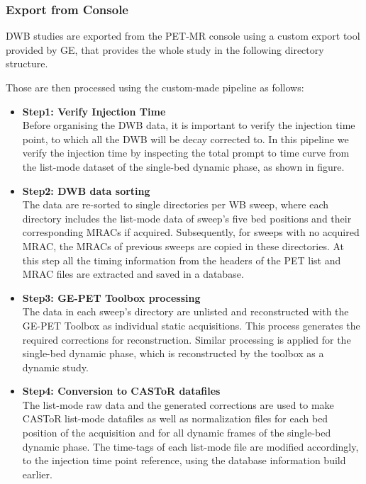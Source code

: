 \subsubsection{Export from Console}
DWB studies are exported from the PET-MR console using a custom export tool provided by GE, that provides the whole study in the following directory structure.  \\

Those are then processed using the custom-made pipeline as follows:
\begin{itemize}
    \item \textbf{Step1: Verify Injection Time} \\
    Before organising the DWB data, it is important to verify the injection time point, to which all the DWB will be decay corrected to. 
    In this pipeline we verify the injection time by inspecting the total prompt to time curve from the list-mode dataset of the single-bed dynamic phase, as shown in figure. 
    \item \textbf{Step2: DWB data sorting} \\
    The data are re-sorted to single directories per WB sweep, where each directory includes the list-mode data of sweep's five bed positions and their corresponding MRACs if acquired. Subsequently, for sweeps with no acquired MRAC, the MRACs of previous sweeps are copied in these directories.
    At this step all the timing information from the headers of the PET list and MRAC files are extracted and saved in a database. 
    \item \textbf{Step3: GE-PET Toolbox processing } \\
    The data in each sweep's directory are unlisted and reconstructed with the GE-PET Toolbox as individual static acquisitions. This process generates the required corrections for reconstruction. Similar processing is applied for the single-bed dynamic phase, which is reconstructed by the toolbox as a dynamic study.
    \item \textbf{Step4: Conversion to CASToR datafiles} \\
    The list-mode raw data and the generated corrections are used to make CASToR list-mode datafiles as well as normalization files for each bed position of the acquisition and for all dynamic frames of the single-bed dynamic phase. 
    The time-tags of each list-mode file are modified accordingly, to the injection time point reference, using the database information build earlier. 
\end{itemize}

